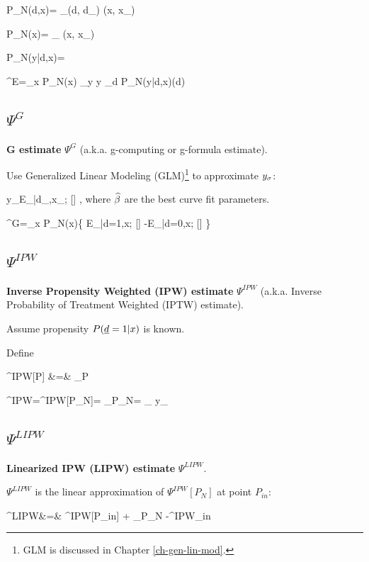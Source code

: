 \beq
P_N(d,x)= \sum_\s \delta(d, d_\s)
\delta(x, x_\s)
\eeq

\beq
P_N(x)= \sum_\s
\delta(x, x_\s)
\eeq

\beq
P_N(y|d,x)= 
\eeq


\beq
\Psi^{E}=\sum_x P_N(x)
\sum_y y \sum_d P_N(y|d,x)\Delta(d)
\eeq

\subsection{$\Psi^{G}$}

{\bf G estimate} $\Psi^G$
(a.k.a. g-computing or g-formula estimate).

Use Generalized 
Linear Modeling (GLM)\footnote{GLM
is discussed in Chapter \ref{ch-gen-lin-mod}.}
to approximate $y_\sigma$:

\beq
y_\s\approx E_{\rvy|d_\s,x_\s; \HAT{\beta}}[\rvy]
\;,
\eeq
where $\widehat{\beta}$ are the best curve fit parameters.

\beq
\Psi^{G}=\sum_x P_N(x)\{
E_{\rvy|d=1,x; \HAT{\beta}}[\rvy]
-E_{\rvy|d=0,x; \HAT{\beta}}[\rvy]
\}
\eeq

\subsection{$\Psi^{IPW}$}

{\bf Inverse Propensity Weighted (IPW) estimate} $\Psi^{IPW}$
(a.k.a. Inverse Probability of Treatment Weighted (IPTW) estimate).

Assume propensity $P({\underline{d}}=1|x)$ is known.

Define

\beqa
\Psi^{IPW}[P]
&=&
_P
\eeqa

\beq
\Psi^{IPW}=\Psi^{IPW}[P_N]=
_{P_N}=
\sum_\s
y_\s {}
\eeq


\subsection{$\Psi^{LIPW}$}

{\bf Linearized IPW (LIPW) estimate} $\Psi^{LIPW}$.


$\Psi^{LIPW}$ is the
linear approximation of $\Psi^{IPW}[P_N]$
at point $P_{in}$:

\beqa
\Psi^{LIPW}&=&
\Psi^{IPW}[P_{in}] +
_{P_N}
-\nabla\Psi^{IPW}_{in}
\eeqa



